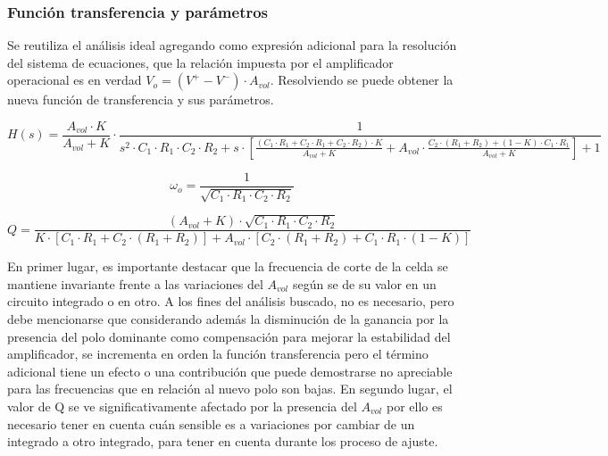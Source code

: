 \subsubsection{Funci\'on transferencia y par\'ametros}
Se reutiliza el an\'alisis ideal agregando como expresi\'on adicional para la resoluci\'on del sistema de ecuaciones,
que la relaci\'on impuesta por el amplificador operacional es en verdad $V_o = (V^{+} - V^{-}) \cdot A_{vol}$. Resolviendo
se puede obtener la nueva funci\'on de transferencia y sus par\'ametros.

\begin{equation*}
    H(s) = \frac{A_{vol} \cdot K}{A_{vol} + K} \cdot \frac{1}
    {s^{2} \cdot C_1 \cdot R_1 \cdot C_2 \cdot R_2
    + s \cdot \left[ \frac{(C_1 \cdot R_1 + C_2 \cdot R_1 + C_2 \cdot R_2) \cdot K}{A_{vol} + K} + A_{vol} \cdot \frac{C_2 \cdot (R_1 + R_2) + (1 - K) \cdot C_1 \cdot R_1}{A_{vol} + K} \right]
    +1}
    \label{eq:transferencia_sallen_key_real}
\end{equation*}

\begin{equation}
    \omega_o = \frac{1}{\sqrt{C_1 \cdot R_1 \cdot C_2 \cdot R_2}}
\end{equation}

\begin{equation}
    Q = \frac{(A_{vol} + K) \cdot \sqrt{C_1 \cdot R_1 \cdot C_2 \cdot R_2}}{K \cdot \left[ C_1 \cdot R_1 + C_2 \cdot (R_1 + R_2) \right] + A_{vol} \cdot \left[ C_2 \cdot (R_1 + R_2) + C_1 \cdot R_1 \cdot (1 - K) \right]}
\end{equation}

En primer lugar, es importante destacar que la frecuencia de corte de la celda se mantiene invariante frente a las variaciones del $A_{vol}$ seg\'un se de su valor en un circuito integrado o en otro. A los fines del an\'alisis buscado,
no es necesario, pero debe mencionarse que considerando adem\'as la disminuci\'on de la ganancia por la presencia del polo dominante como compensaci\'on para mejorar la estabilidad del amplificador, se incrementa en orden la funci\'on transferencia pero
el t\'ermino adicional tiene un efecto o una contribuci\'on que puede demostrarse no apreciable para las frecuencias que en relaci\'on al nuevo polo son bajas.
En segundo lugar, el valor de Q se ve significativamente afectado por la presencia del $A_{vol}$ por ello es necesario tener en cuenta cu\'an sensible es a variaciones por cambiar de un integrado a otro integrado,
para tener en cuenta durante los proceso de ajuste.


